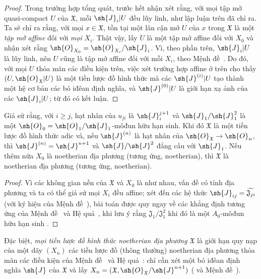 \documentclass[oneside]{amsart}
\makeatletter
\renewcommand{\geq}{\geqslant}
\newcommand{\ega@arrow}[2]{\mathchoice{#1}{#2}{#2}{#2}}
\renewcommand{\to}{\ega@arrow{\longrightarrow}{\rightarrow}}
\newcommand{\oldpage}[2][]{{\marginnote{\normalfont\textbf{#1}~|~#2}}\ignorespaces}
\let\EGAOriginalLabel\label
\renewcommand{\label}[1]{\phantomsection\EGAOriginalLabel{#1}}
\makeatother
\begin{document}
\begin{proof}
Trong trường hợp tổng quát, trước hết nhận xét rằng, với mọi tập mở quasi-compact $U$ của $\mathfrak{X}$, mỗi $\sh{J}_i|U$ đều lũy linh, như lập luận trên đã chỉ ra.
Ta sẽ chỉ ra rằng, với mọi $x\in\mathfrak{X}$, tồn tại một lân cận mở $U$ của $x$ trong $\mathfrak{X}$ là một \emph{tập mở affine} đối với \emph{mọi} $X_i$.
Thật vậy, lấy $U$ là một tập mở affine đối với $X_0$ và nhận xét rằng $\sh{O}_{X_0}=\sh{O}_{X_i}/\sh{J}_i$.
Vì, theo phần trên, $\sh{J}_i|U$ là lũy linh, nên $U$ cũng là tập mở affine đối với mỗi $X_i$, theo Mệnh đề~.
Do đó, với mọi $U$ thỏa mãn các điều kiện trên, việc xét trường hợp affine ở trên cho thấy $(U,\sh{O}_\mathfrak{X}|U)$ là một tiền lược đồ hình thức mà các $\sh{J}^{(i)}|U$ tạo thành một hệ cơ bản các bó iđêan định nghĩa, và $\sh{J}^{(0)}|U$ là giới hạn xạ ảnh của các $\sh{J}_i|U$; từ đó có kết luận.
\end{proof}

\begin{corollary}[10.6.4]
\label{I.10.6.4}
Giả sử rằng, với $i\geq j$, hạt nhân của $u_{ji}$ là $\sh{J}_i^{j+1}$ và $\sh{J}_1/\sh{J}_1^2$
\oldpage[I]{191}
là một $\sh{O}_0=\sh{O}_1/\sh{J}_1$-môđun hữu hạn sinh.
Khi đó $\mathfrak{X}$ là một tiền lược đồ hình thức adic và, nếu $\sh{J}^{(n)}$ là hạt nhân của $\sh{O}_\mathfrak{X}\to\sh{O}_n$, thì $\sh{J}^{(n)}=\sh{J}^{n+1}$ và $\sh{J}/\sh{J}^2$ đẳng cấu với $\sh{J}_1$.
Nếu thêm nữa $X_0$ là noetherian địa phương (tương ứng, noetherian), thì $\mathfrak{X}$ là noetherian địa phương (tương ứng, noetherian).
\end{corollary}

\begin{proof}
Vì các không gian nền của $\mathfrak{X}$ và $X_0$ là như nhau, vấn đề có tính địa phương và ta có thể giả sử mọi $X_i$ đều affine; xét đến các hệ thức $\sh{J}_{ij}=\widetilde{\mathfrak{J}_{ji}}$ (với ký hiệu của Mệnh đề~), bài toán được quy ngay về các khẳng định tương ứng của Mệnh đề~ và Hệ quả~, khi lưu ý rằng $\mathfrak{J}_1/\mathfrak{J}_1^2$ khi đó là một $A_0$-môđun hữu hạn sinh .
\end{proof}

Đặc biệt, \emph{mọi tiền lược đồ hình thức noetherian địa phương $\mathfrak{X}$} là giới hạn quy nạp của một dãy $(X_n)$ các tiền lược đồ (thông thường) noetherian địa phương thỏa mãn các điều kiện của Mệnh đề~ và Hệ quả~: chỉ cần xét một bó iđêan định nghĩa $\sh{J}$ của $\mathfrak{X}$  và lấy $X_n=(\mathfrak{X},\sh{O}_\mathfrak{X}/\sh{J}^{n+1})$ ( và Mệnh đề~).
\end{document}
